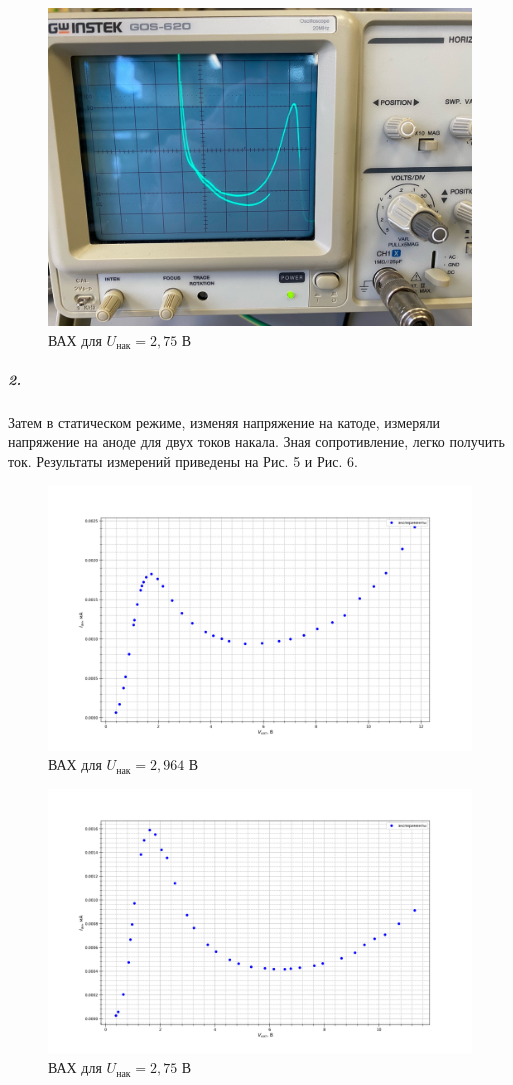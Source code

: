 \documentclass[a4paper,12pt]{article}
\begin{document}
\begin{figure}[!h]
\centering
\includegraphics[width=0.7\linewidth]{XHpdd6O5oJE.jpg}
\caption{ВАХ для $U_{нак}=2,75$ В}
\label{fig:mpr}
\end{figure}

\subparagraph{2.}Затем в статическом режиме, изменяя напряжение на катоде, измеряли напряжение на аноде для двух токов накала. Зная сопротивление, легко получить ток. Результаты измерений приведены на Рис. 5 и Рис. 6.

\begin{figure}[!h]
\centering
\includegraphics[width=0.8\linewidth]{nakal1.png}
\caption{ВАХ для $U_{нак}=2,964$ В}
\label{fig:mpr}
\end{figure}

\begin{figure}[!h]
\centering
\includegraphics[width=0.8\linewidth]{nakal2.png}
\caption{ВАХ для $U_{нак}=2,75$ В}
\label{fig:mpr}
\end{figure}
\end{document}
